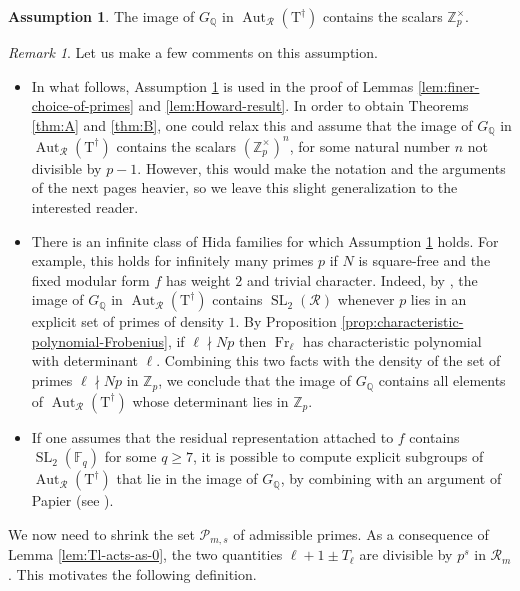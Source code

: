 \documentclass[12pt,reqno]{amsart}
\theoremstyle{definition}
\newtheorem{assumption}[theorem]{Assumption}
\theoremstyle{remark}
\newtheorem{remark}[theorem]{Remark}
\newcommand{\numberset}{\mathbb}
\newcommand{\Q}{\numberset{Q}}
\newcommand{\Z}{\numberset{Z}}
\newcommand{\T}{\boldsymbol{\mathrm{T}}}
\newcommand{\calR}{\mathcal{R}}
\DeclareMathOperator{\SL}{SL}
\DeclareMathOperator{\Aut}{Aut}
\DeclareMathOperator{\Fr}{Fr}
\newcommand{\F}{\numberset{F}}
\begin{document}
\begin{assumption}\label{ass:big-image}
    The image of $G_\Q$ in $\Aut_{\mathcal{R}}(\T^{\dag})$ contains the scalars $\Z_p^\times$.
\end{assumption}

\begin{remark}
    Let us make a few comments on this assumption.
    \begin{itemize}
        \item[(i)] In what follows, Assumption \ref{ass:big-image} is used in the proof of Lemmas \ref{lem:finer-choice-of-primes} and \ref{lem:Howard-result}. In order to obtain Theorems \ref{thm:A} and \ref{thm:B}, one could relax this and assume that the image of $G_\Q$ in $\Aut_{\mathcal{R}}(\T^{\dag})$ contains the scalars $(\Z_p^\times)^n$, for some natural number $n$ not divisible by $p-1$. However, this would make the notation and the arguments of the next pages heavier, so we leave this slight generalization to the interested reader.
        \item[(ii)] There is an infinite class of Hida families for which Assumption \ref{ass:big-image} holds. For example, this holds for infinitely many primes $p$ if $N$ is square-free and the fixed modular form $f$ has weight $2$ and trivial character. Indeed, by \cite[Theorem 4.15]{Vigni22:shafarevich-tate-groups}, the image of $G_\Q$ in $\Aut_{\mathcal{R}}(\T^{\dag})$ contains $\SL_2(\mathcal{R})$ whenever $p$ lies in an explicit set of primes of density $1$. By Proposition \ref{prop:characteristic-polynomial-Frobenius}, if $\ell\nmid Np$ then $\Fr_\ell$ has characteristic polynomial with determinant $\ell$. Combining this two facts with the density of the set of primes $\ell\nmid Np$ in $\Z_p$, we conclude that the image of $G_\Q$ contains all elements of $\Aut_{\mathcal{R}}(\T^{\dag})$ whose determinant lies in $\Z_p$.
        \item[(iii)] If one assumes that the residual representation attached to $f$ contains $\SL_2(\F_q)$ for some $q\ge 7$, it is possible to compute explicit subgroups of $\Aut_{\mathcal{R}}(\T^{\dag})$ that lie in the image of $G_\Q$, by combining \cite[Corollary 11.2]{Conti-Lang-Medvedovsky23:Big-images} with an argument of Papier (see \cite[Section 4]{Ribet_1985}).
    \end{itemize}
\end{remark}

We now need to shrink the set $\mathcal{P}_{m,s}$ of admissible primes. As a consequence of Lemma \ref{lem:Tl-acts-as-0}, the two quantities $\ell+1\pm T_\ell$ are divisible by $p^s$ in $\calR_m$. This motivates the following definition.
\end{document}

